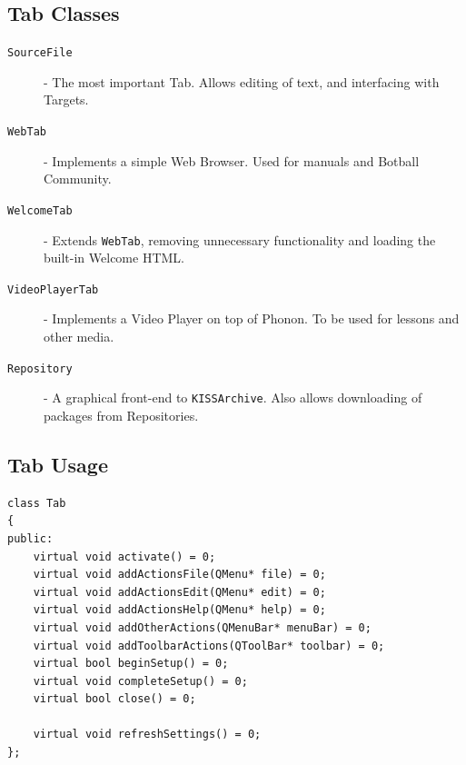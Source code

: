 \documentclass[7pt,letterpaper]{article}
\newcommand{\code}[1]{\texttt{#1}}
\begin{document}
	\subsection{Tab Classes}
	
	\begin{description}
	\item[\code{SourceFile}] - The most important Tab. Allows editing of text, and interfacing with Targets.
	\item[\code{WebTab}] - Implements a simple Web Browser. Used for manuals and Botball Community.
	\item[\code{WelcomeTab}] - Extends \code{WebTab}, removing unnecessary functionality and loading the built-in Welcome HTML.
	\item[\code{VideoPlayerTab}] - Implements a Video Player on top of Phonon. To be used for lessons and other media.
	\item[\code{Repository}] - A graphical front-end to \code{KISSArchive}. Also allows downloading of packages from Repositories.
	\end{description}
	\singlespacing
	
	\subsection{Tab Usage}
	
	\begin{lstlisting}
class Tab
{
public:	
	virtual void activate() = 0;
	virtual void addActionsFile(QMenu* file) = 0;
	virtual void addActionsEdit(QMenu* edit) = 0;
	virtual void addActionsHelp(QMenu* help) = 0;
	virtual void addOtherActions(QMenuBar* menuBar) = 0;
	virtual void addToolbarActions(QToolBar* toolbar) = 0;
	virtual bool beginSetup() = 0;
	virtual void completeSetup() = 0;
	virtual bool close() = 0;

	virtual void refreshSettings() = 0;
};
	\end{lstlisting}
	\vspace{.25in}
	
\end{document}
